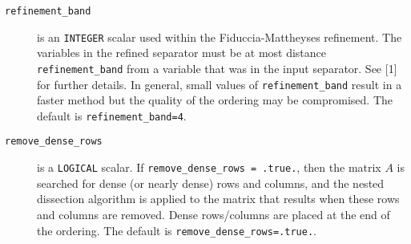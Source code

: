 \begin{description}

\item[\texttt{refinement\_band}] is an {\tt INTEGER} scalar used within the 
Fiduccia-Mattheyses refinement. The variables in the refined separator must be 
at most distance {\tt refinement\_band} from a variable that was in the input 
separator. See [1] for further details. In general, small 
values of {\tt refinement\_band} result in a faster method but the quality of 
the ordering may be compromised. The default is {\tt refinement\_band=4}.

\item[\texttt{remove\_dense\_rows}] is a {\tt LOGICAL} scalar. If {\tt remove\_dense\_rows = .true.}, 
then the matrix $A$ is searched for dense (or nearly dense) rows and columns, 
and the nested dissection algorithm is applied to the matrix that results when 
these rows and columns are removed. Dense rows/columns are placed at the end of 
the ordering. The default is {\tt remove\_dense\_rows=.true.}.




\end{description}
